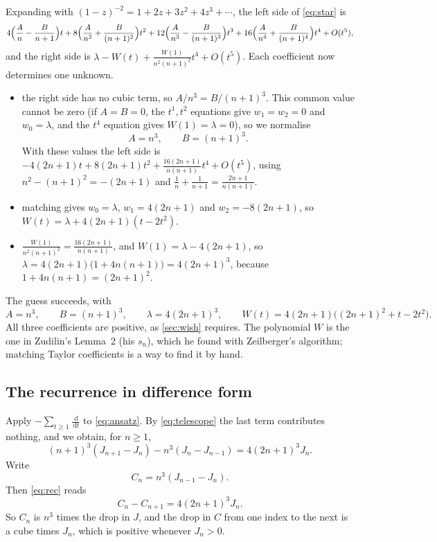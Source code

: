 \documentclass[11pt]{article}
\newcommand{\dd}{\,\mathrm{d}}
\theoremstyle{plain}
\theoremstyle{definition}
\theoremstyle{remark}
\begin{document}
Expanding with $(1-z)^{-2}=1+2z+3z^2+4z^3+\cdots$, the left side of \eqref{eq:star} is
\[
  4\Bigl(\frac An-\frac B{n+1}\Bigr)t+8\Bigl(\frac A{n^2}+\frac B{(n+1)^2}\Bigr)t^2
  +12\Bigl(\frac A{n^3}-\frac B{(n+1)^3}\Bigr)t^3+16\Bigl(\frac A{n^4}+\frac B{(n+1)^4}\Bigr)t^4+O(t^5),
\]
and the right side is $\lambda-W(t)+\frac{W(1)}{n^2(n+1)^2}t^4+O(t^5)$. Each coefficient now
determines one unknown.
\begin{itemize}
  \item[$t^3$:] the right side has no cubic term, so $A/n^3=B/(n+1)^3$. This common value cannot
    be zero (if $A=B=0$, the $t^1,t^2$ equations give $w_1=w_2=0$ and $w_0=\lambda$, and the $t^4$
equation gives $W(1)=\lambda=0$), so we normalise
    \[A=n^3,\qquad B=(n+1)^3.\]
    With these values the left side is
    $-4(2n+1)t+8(2n+1)t^2+\frac{16(2n+1)}{n(n+1)}t^4+O(t^5)$, using $n^2-(n+1)^2=-(2n+1)$ and
    $\frac1n+\frac1{n+1}=\frac{2n+1}{n(n+1)}$.
  \item[$t^0,t^1,t^2$:] matching gives $w_0=\lambda$, $w_1=4(2n+1)$ and $w_2=-8(2n+1)$, so
    $W(t)=\lambda+4(2n+1)(t-2t^2)$.
  \item[$t^4$:] $\frac{W(1)}{n^2(n+1)^2}=\frac{16(2n+1)}{n(n+1)}$, and $W(1)=\lambda-4(2n+1)$, so
    $\lambda=4(2n+1)\bigl(1+4n(n+1)\bigr)=4(2n+1)^3$, because $1+4n(n+1)=(2n+1)^2$.
\end{itemize}
The guess succeeds, with
\[
  A=n^3,\qquad B=(n+1)^3,\qquad \lambda=4(2n+1)^3,\qquad W(t)=4(2n+1)\bigl((2n+1)^2+t-2t^2\bigr).
\]
All three coefficients are positive, as \cref{sec:wish} requires. The polynomial $W$ is the
one in Zudilin's Lemma~2 (his $s_n$), which he found with Zeilberger's algorithm; matching Taylor
coefficients is a way to find it by hand.

\subsection{The recurrence in difference form}

Apply $-\sum_{t\ge1}\frac{\dd}{\dd t}$ to \eqref{eq:ansatz}. By \eqref{eq:telescope} the last term
contributes nothing, and we obtain, for $n\ge1$,
\begin{equation}\label{eq:rec}
  (n+1)^3(J_{n+1}-J_n)-n^3(J_n-J_{n-1})=4(2n+1)^3J_n .
\end{equation}
Write
\[
  C_n=n^3(J_{n-1}-J_n).
\]
Then \eqref{eq:rec} reads
\begin{equation}\label{eq:flux}
  C_n-C_{n+1}=4(2n+1)^3J_n .
\end{equation}
So $C_n$ is $n^3$ times the drop in $J$, and the drop in $C$ from one index to the next is a cube
times $J_n$, which is positive whenever $J_n>0$.
\end{document}
